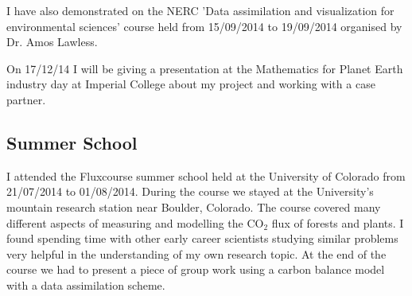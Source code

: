 \documentclass[11pt]{article}
\begin{document}
I have also demonstrated on the NERC 'Data assimilation and visualization for environmental sciences' course held from 15/09/2014 to 19/09/2014 organised by Dr. Amos Lawless.

On 17/12/14 I will be giving a presentation at the Mathematics for Planet Earth industry day at Imperial College about my project and working with a case partner.

\subsection{Summer School}
I attended the Fluxcourse summer school held at the University of Colorado from 21/07/2014 to 01/08/2014. During the course we stayed at the University's mountain research station near Boulder, Colorado. The course covered many different aspects of measuring and modelling the CO$_2$ flux of forests and plants. I found spending time with other early career scientists studying similar problems very helpful in the understanding of my own research topic. At the end of the course we had to present a piece of group work using a carbon balance model with a data assimilation scheme.


{}

\end{document}
